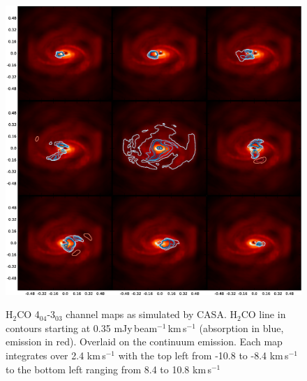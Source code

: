 \documentclass[useAMS,usenatbib]{mn2e}
\begin{document}


%
%
%
%
%

\begin{figure}
 \includegraphics[width=168mm]{Figures/sim/channel_map-1.eps} 
 \label{h2co_chanmap}
 \caption{H$_2$CO 4$_{04}$-3$_{03}$ channel maps as simulated by CASA. H$_2$CO line in contours starting at 0.35 mJy$\,$beam$^{-1}\,$km$\,$s$^{-1}$ (absorption in blue, emission in red). Overlaid on the continuum emission. Each map integrates over 2.4 km$\,$s$^{-1}$ with the top left from -10.8 to -8.4 km$\,$s$^{-1}$ to the bottom left ranging from 8.4 to 10.8 km$\,$s$^{-1}$}
\end{figure}
\end{document}
